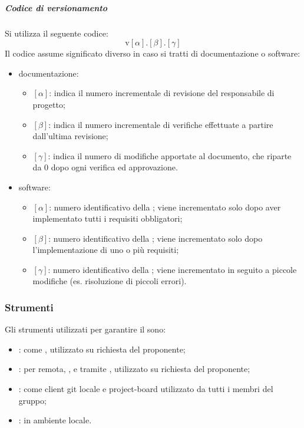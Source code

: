             \subparagraph{Codice di versionamento}
            Si utilizza il seguente codice:
            \[
            \text{v}[\alpha].[\beta].[\gamma]
            \]
            Il codice assume significato diverso in caso si tratti di documentazione o software:
            \begin{itemize}
                \item documentazione:
                \begin{itemize}
                	\item \([\alpha]\): indica il numero incrementale di revisione del responsabile
                	di progetto;
                	\item \([\beta]\): indica il numero incrementale di verifiche effettuate a partire dall'ultima revisione;
                	\item \([\gamma]\): indica il numero di modifiche apportate al documento, che
                	riparte da 0 dopo ogni verifica ed approvazione.
                \end{itemize}

                \item software:
                \begin{itemize}
                    \item \([\alpha]\): numero identificativo della ; viene incrementato solo dopo aver implementato tutti i requisiti obbligatori;
                    \item \([\beta]\): numero identificativo della ; viene incrementato solo dopo l'implementazione di uno o più requisiti;
                    \item \([\gamma]\): numero identificativo della ; viene incrementato in seguito a piccole modifiche (es. risoluzione di piccoli errori).
                \end{itemize}
            \end{itemize}

    \subsubsection{Strumenti}
    Gli strumenti utilizzati per garantire il  sono:
    \begin{itemize}
        \item \textbf{}: come , utilizzato su richiesta del proponente;
        \item \textbf{}: per  remota, ,  e  tramite , utilizzato su richiesta del proponente;
        \item \textbf{}: come client git locale e project-board utilizzato da tutti i membri del gruppo;
        \item \textbf{}:  in ambiente locale.
    \end{itemize}